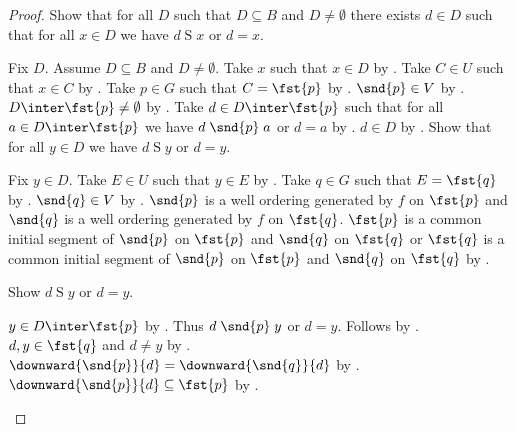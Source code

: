 \begin{proof}
    Show that for all $D$ such that $D\subseteq B$ and $D\neq\emptyset$
        there exists $d\in D$ such that for all $x\in D$ we have $d\mathrel{S}x$ or $d=x$.
    \begin{subproof}
        Fix $D$.
        Assume $D\subseteq B$ and $D\neq\emptyset$.
        Take $x$ such that $x\in D$ by .
        Take $C\in U$ such that $x\in C$ by .
        Take $p\in G$ such that $C=\fst{p}$ by \auto.
        $\snd{p}\in V$ by \auto.
        $D\inter\fst{p}\neq\emptyset$ by .
        Take $d\in D\inter\fst{p}$ such that for all $a\in D\inter\fst{p}$
            we have $d\mathrel{\snd{p}}a$ or $d=a$
            by .
        $d\in D$ by .
        Show that for all $y\in D$ we have $d\mathrel{S}y$ or $d=y$.
        \begin{subproof}
            Fix $y\in D$.
            Take $E\in U$ such that $y\in E$ by .
            Take $q\in G$ such that $E=\fst{q}$ by \auto.
            $\snd{q}\in V$ by \auto.
            $\snd{p}$ is a well ordering generated by $f$ on $\fst{p}$ and
                $\snd{q}$ is a well ordering generated by $f$ on $\fst{q}$.
            $\fst{p}$ is a common initial segment of $\snd{p}$ on $\fst{p}$ and $\snd{q}$ on $\fst{q}$
                or $\fst{q}$ is a common initial segment of $\snd{p}$ on $\fst{p}$ and $\snd{q}$ on $\fst{q}$
                by .
            \begin{byCase}
                Show $d\mathrel{S}y$ or $d=y$.
                \begin{subproof}
                    \begin{byCase}
                        $y\in D\inter\fst{p}$ by .
                        Thus $d\mathrel{\snd{p}}y$ or $d=y$.
                        Follows by .
                        $d,y\in\fst{q}$ and $d\neq y$ by .
                        $\downward{\snd{p}}{d}=\downward{\snd{q}}{d}$
                            by .
                        $\downward{\snd{p}}{d}\subseteq\fst{p}$
                            by .

\end{byCase}
\end{subproof}
\end{byCase}
\end{subproof}
\end{subproof}
\end{proof}
